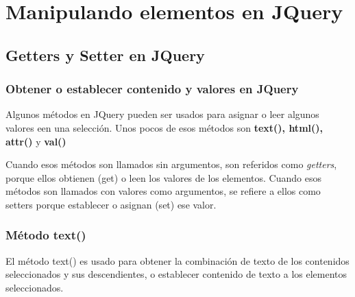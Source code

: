 \documentclass[a4paper, oneside]{article}
\begin{document}
\section{Manipulando elementos en JQuery}
\label{sec:orgecc4af7}

\subsection{Getters y Setter en JQuery}
\label{sec:org950a9f4}

\subsubsection{Obtener o establecer contenido y valores en JQuery}
\label{sec:org90fdd2b}

Algunos métodos en JQuery pueden ser usados para asignar o leer algunos valores een una selección. Unos pocos de esos métodos son \textbf{text(), html(), attr()} y \textbf{val()} 

Cuando esos métodos son llamados sin argumentos, son referidos como \emph{getters}, porque ellos obtienen (get) o leen los valores de los elementos. Cuando esos métodos son llamados con valores como argumentos, se refiere a ellos como  setters porque establecer o asignan (set) ese valor.

\subsubsection{Método text()}
\label{sec:orgd86c5fe}

El método text() es usado para obtener la combinación de texto de los contenidos seleccionados y sus descendientes, o establecer contenido de texto a los elementos seleccionados.
\end{document}
